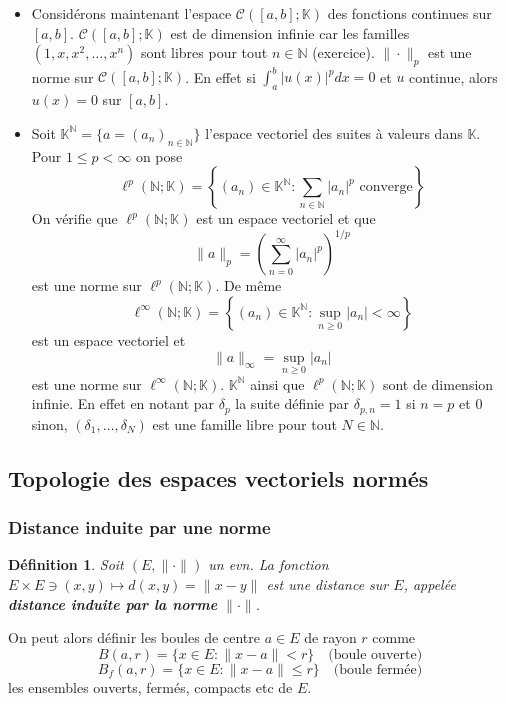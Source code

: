 \documentclass{article}
\newtheorem{definition}{Définition}
\newcommand{\K}{\mathbb{K}}
\newcommand{\N}{\mathbb{N}}
\begin{document}
\begin{itemize}
    \item Considérons maintenant l'espace $\mathcal{C}([a, b]; \K)$ des fonctions continues sur $[a, b]$. $\mathcal{C}([a, b]; \K)$ est de dimension infinie car les familles $(1, x, x^2, \dots, x^n)$ sont libres pour tout $n \in \N$ (exercice).
    $\|\cdot\|_p$ est une norme sur $\mathcal{C}([a, b]; \K)$. En effet si $\int_a^b |u(x)|^p dx = 0$ et $u$ continue, alors $u(x) = 0$ sur $[a, b]$.

    \item Soit $\K^\N = \{a = (a_n)_{n \in \N}\}$ l'espace vectoriel des suites à valeurs dans $\K$.
    Pour $1 \leq p < \infty$ on pose
    \[ \ell^p(\N; \K) = \left\{(a_n) \in \K^\N : \sum_{n \in \N} |a_n|^p \text{ converge}\right\} \]
    On vérifie que $\ell^p(\N; \K)$ est un espace vectoriel et que
    \[ \|a\|_p = \left(\sum_{n=0}^\infty |a_n|^p\right)^{1/p} \]
    est une norme sur $\ell^p(\N; \K)$.
    De même
    \[ \ell^\infty(\N; \K) = \left\{(a_n) \in \K^\N : \sup_{n \geq 0} |a_n| < \infty\right\} \]
    est un espace vectoriel et
    \[ \|a\|_\infty = \sup_{n \geq 0} |a_n| \]
    est une norme sur $\ell^\infty(\N; \K)$. $\K^\N$ ainsi que $\ell^p(\N; \K)$ sont de dimension infinie. En effet en notant par $\delta_p$ la suite définie par $\delta_{p,n} = 1$ si $n = p$ et 0 sinon, $(\delta_1, \dots, \delta_N)$ est une famille libre pour tout $N \in \N$.
\end{itemize}

\subsection{Topologie des espaces vectoriels normés}

\subsubsection{Distance induite par une norme}

\begin{definition}
Soit $(E, \|\cdot\|)$ un evn. La fonction $E \times E \ni (x, y) \mapsto d(x, y) = \|x - y\|$ est une distance sur $E$, appelée \textbf{distance induite par la norme} $\|\cdot\|$.
\end{definition}

On peut alors définir les boules de centre $a \in E$ de rayon $r$ comme
\[ B(a, r) = \{x \in E : \|x - a\| < r\} \quad \text{(boule ouverte)} \]
\[ B_f(a, r) = \{x \in E : \|x - a\| \leq r\} \quad \text{(boule fermée)} \]
les ensembles ouverts, fermés, compacts etc de $E$.
\end{document}
